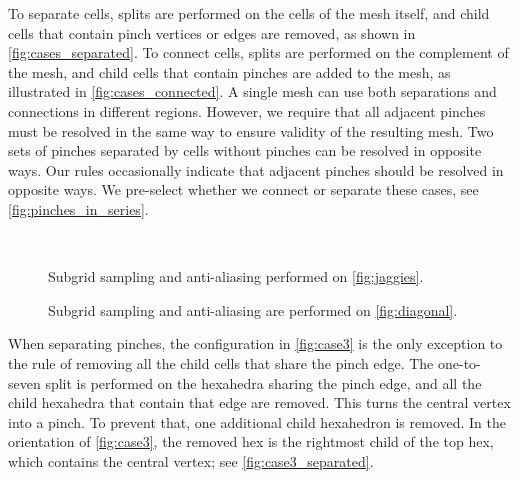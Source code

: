 To separate cells, splits are performed on the cells of the mesh itself, and child cells that contain pinch vertices or edges are removed, as shown in \cref{fig:cases_separated}.
To connect cells, splits are performed on the complement of the mesh, and child cells that contain pinches are added to the mesh, as illustrated in \cref{fig:cases_connected}.
A single mesh can use both separations and connections in different regions.
However, we require that all adjacent pinches must be resolved in the same way to ensure validity of the resulting mesh.
Two sets of pinches separated by cells without pinches can be resolved in opposite ways.
Our rules occasionally indicate that adjacent pinches should be resolved in opposite ways.
We pre-select whether we connect or separate these cases, see \cref{fig:pinches_in_series}.

\begin{figure}[!htb]
\centering
{}
\\
\caption{Subgrid sampling and anti-aliasing performed on \cref{fig:jaggies}.}
\label{fig:jaggies_subcells}
\end{figure}

\begin{figure}[!htb]
\centering
{}
\hspace{8pt}
\caption{Subgrid sampling and anti-aliasing are performed on \cref{fig:diagonal}.}
\label{fig:diagonal_subcells}
\end{figure}

When separating pinches, the configuration in \cref{fig:case3} is the only exception to the rule of removing all the child cells that share the pinch edge. 
The one-to-seven split is performed on the hexahedra sharing the pinch edge, and all the child hexahedra that contain that edge are removed. 
This turns the central vertex into a pinch. To prevent that, one additional child hexahedron is removed. 
In the orientation of  \cref{fig:case3}, the removed hex is the rightmost child of the top hex, which contains the central vertex; see \cref{fig:case3_separated}.

